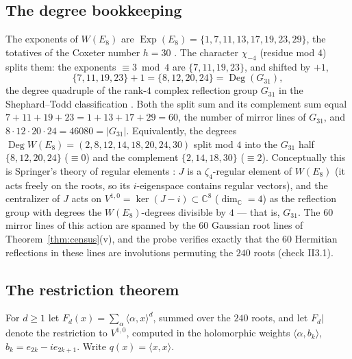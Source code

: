 \documentclass[11pt,a4paper]{article}
\theoremstyle{remark}
\newcommand{\C}{\mathbb C}
\newcommand{\ip}[2]{\langle #1,#2\rangle}
\DeclareMathOperator{\Deg}{Deg}
\DeclareMathOperator{\Exp}{Exp}
\begin{document}
\subsection{The degree bookkeeping}
The exponents of $W(E_8)$ are
$\Exp(E_8)=\{1,7,11,13,17,19,23,29\}$, the totatives of the Coxeter
number $h=30$ \cite{Bou68}.  The character $\chi_{-4}$ (residue mod
$4$) splits them: the exponents $\equiv3\bmod4$ are $\{7,11,19,23\}$,
and shifted by $+1$,
\[
\{7,11,19,23\}+1=\{8,12,20,24\}=\Deg(G_{31}),
\]
the degree quadruple of the rank-$4$ complex reflection group
$G_{31}$ in the Shephard--Todd classification \cite{ST54,LT09}.  Both
the split sum and its complement sum equal
$7+11+19+23=1+13+17+29=60$, the number of mirror lines of $G_{31}$,
and $8\cdot12\cdot20\cdot24=46080=|G_{31}|$.  Equivalently, the
degrees $\Deg W(E_8)=(2,8,12,14,18,20,24,30)$ split mod $4$ into the
$G_{31}$ half $\{8,12,20,24\}$ ($\equiv0$) and the complement
$\{2,14,18,30\}$ ($\equiv2$).  Conceptually this is Springer's theory
of regular elements \cite{Spr74}: $J$ is a $\zeta_4$-regular element
of $W(E_8)$ (it acts freely on the roots, so its $i$-eigenspace
contains regular vectors), and the centralizer of $J$ acts on
$V^{1,0}=\ker(J-i)\subset\C^8$ ($\dim_\C=4$) as the reflection group
with degrees the $W(E_8)$-degrees divisible by $4$ --- that is,
$G_{31}$.  The $60$ mirror lines of this action are spanned by the
$60$ Gaussian root lines of Theorem~\ref{thm:census}(v), and the
probe verifies exactly that the $60$ Hermitian reflections in these
lines are involutions permuting the $240$ roots (check II3.1).

\subsection{The restriction theorem}
For $d\ge1$ let $F_d(x)=\sum_{\alpha}\ip\alpha x^d$, summed over the
$240$ roots, and let $F_d|$ denote the restriction to $V^{1,0}$,
computed in the holomorphic weights
$\ip\alpha{b_k}$, $b_k=e_{2k}-ie_{2k+1}$.  Write
$q(x)=\ip xx$.
\end{document}
